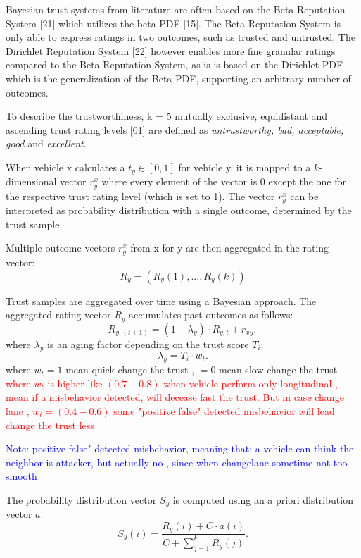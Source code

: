 \documentclass[letterpaper, 10pt, conference]{ieeeconf}  %
\begin{document}
Bayesian trust systems from literature are often based on the Beta Reputation System [21] which utilizes the beta PDF [15]. The Beta Reputation System is only able to express ratings in two outcomes, such as trusted and untrusted. The Dirichlet Reputation System [22] however
enables more fine granular ratings compared to the Beta Reputation System, as is is based on the Dirichlet PDF which is the generalization of the Beta PDF, supporting an arbitrary number of outcomes.


To describe the trustworthiness, k = 5 mutually exclusive, equidistant and ascending trust rating levels [01] are defined as \textit{untrustworthy, bad, acceptable, good } and \textit{excellent}.

When vehicle x calculates a $t_y \in [0, 1]$ for vehicle y, it is mapped to a $k$-dimensional vector $r_y^x$ where every element of the vector is 0 except the one for the respective trust rating level (which is set to 1). The vector $r_y^x$ can be interpreted as probability distribution with a single outcome, determined
by the trust sample. 

Multiple outcome vectors $r_y^x$ from x for y are then aggregated in the rating vector:
\begin{equation}
    R_y = (R_y(1), . . . , R_y(k))
\end{equation}


Trust samples are aggregated over time using a Bayesian approach. The aggregated rating vector $R_y$ accumulates past outcomes as follows:
\begin{equation}
    R_{y,(t+1)} = (1 - \lambda_y) \cdot R_{y,t} + r_{xy},
\end{equation}
where $\lambda_y$ is an aging factor depending on the trust score $T_i$:
\begin{equation}
    \lambda_y = T_i \cdot w_t.
\end{equation}
where $w_t = 1$ mean quick change the trust , $=0$ mean slow change the trust  
\textcolor{red}{where $w_t$ is higher like $(0.7 - 0.8)$ when vehicle perform only longitudinal , mean if a misbehavior detected, will decease fast the trust. But in case change lane , $w_t = ( 0.4 - 0.6)$ some "positive false" detected misbehavior will lead change the trust less}

\textcolor{blue}{Note: positive false" detected misbehavior, meaning that: a vehicle can think the neighbor is attacker, but actually no , since when changelane sometime not too smooth}


The probability distribution vector $S_y$ is computed using an a priori distribution vector $a$:
\begin{equation}
    S_y(i) = \frac{R_y(i) + C \cdot a(i)}{C + \sum_{j=1}^k R_y(j)}.
\end{equation}
\end{document}
